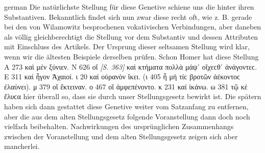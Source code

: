 \begin{otherlanguage*}{german}
Die natürlichste Stellung für diese Genetive schiene uns die hinter ihren Substantiven. Bekanntlich findet sich nun zwar diese recht oft, wie z. B. gerade bei den von Wilamowitz besprochenen vokativischen Verbindungen, aber daneben als völlig gleichberechtigt die Stellung vor dem Substantiv und dessen Attributen mit Einschluss des Artikels. Der Ursprung dieser seltsamen Stellung wird klar, wenn wir die ältesten Beispiele derselben prüfen. Schon Homer hat diese Stellung Α 273 καὶ μέν   ξύνιεν. Ν 626 οἵ  \hypertarget{p363}{\emph{[S. 363]}}\label{p363}   καὶ κτήματα πολλὰ μάψ᾽ οἴχεϲθ᾽ ἀνάγοντεϲ. Ε 311 καί   ἦγον Ἀχαιοί. ι 20 καί   οὐρανὸν ἵκει. (ι 405 ἦ μή τίϲ  βροτῶν ἀέκοντοϲ ἐλαύνει). μ 379 οἵ  ἔκτειναν. ο 467 οἵ  ἀμφεπένοντο. κ 231 καί  ἱκάνω. ω 381 τῷ κέ  ἔλυϲα hier überall so, dass sie durch unser Stellungsgesetz bewirkt ist. Die spätern haben sich dann gestattet diese Genetive weiter vom Satzanfang zu entfernen, aber die aus dem alten Stellungsgesetz folgende Voranstellung dann doch noch vielfach beibehalten. Nachwirkungen des ursprünglichen Zusammenhangs zwischen der Voranstellung und dem alten Stellungsgesetz zeigen sich aber mancherlei.


\end{otherlanguage*}
